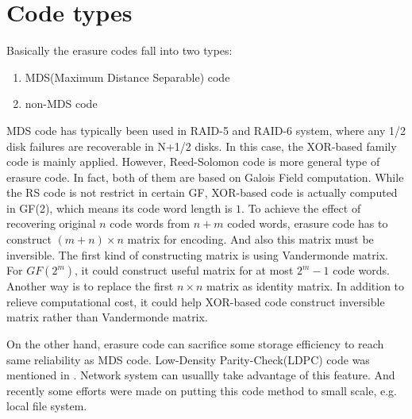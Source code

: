 \documentclass[a4paper, 12pt]{article}
\begin{document}
\section{Code types}
Basically the erasure codes fall into two types:
\begin{enumerate}
\item
  MDS(Maximum Distance Separable) code
\item
  non-MDS code
\end{enumerate}
MDS code has typically been used in RAID-5 and RAID-6 system, where
any 1/2 disk failures are recoverable in N+1/2 disks. In this case,
the XOR-based family code is mainly applied. However, Reed-Solomon\cite{reed60}
code is more general type of erasure code. In fact, both of them are
based on Galois Field computation. While the RS code is not restrict
in certain GF, XOR-based code is actually computed in GF(2), which
means its code word length is $1$. To achieve the effect of recovering
original $n$ code words from $n + m$ coded words, erasure code has to
construct $(m + n) \times n$ matrix for encoding. And also this matrix
must be inversible. The first kind of constructing matrix is using
Vandermonde matrix. For $GF(2^m)$, it could construct useful matrix
for at most $2^m - 1$ code words. Another way is to replace the first
$n \times n$ matrix as identity matrix. In addition to relieve
computational cost, it could help XOR-based code construct inversible
matrix rather than Vandermonde matrix. 

On the other hand, erasure code can sacrifice some storage efficiency
to reach same reliability as MDS code. Low-Density Parity-Check(LDPC)
code was mentioned in \cite{luby97, gallager63}. Network system can
usuallly take advantage of this feature\cite{byers98}. And recently
some efforts were made on putting this code method to small scale,
e.g. local file system\cite{woitaszek07, hafner05}. 
\end{document}

